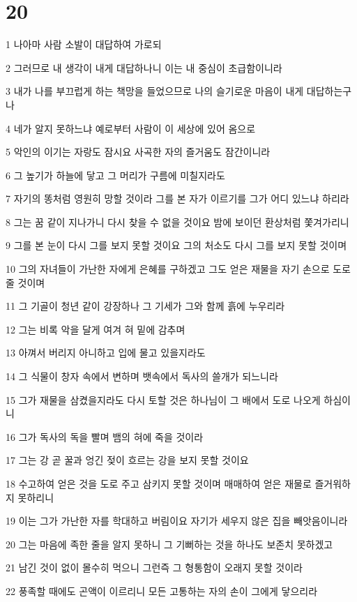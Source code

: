 \chapter{20}

\par 1 나아마 사람 소발이 대답하여 가로되
\par 2 그러므로 내 생각이 내게 대답하나니 이는 내 중심이 초급함이니라
\par 3 내가 나를 부끄럽게 하는 책망을 들었으므로 나의 슬기로운 마음이 내게 대답하는구나
\par 4 네가 알지 못하느냐 예로부터 사람이 이 세상에 있어 옴으로
\par 5 악인의 이기는 자랑도 잠시요 사곡한 자의 즐거움도 잠간이니라
\par 6 그 높기가 하늘에 닿고 그 머리가 구름에 미칠지라도
\par 7 자기의 똥처럼 영원히 망할 것이라 그를 본 자가 이르기를 그가 어디 있느냐 하리라
\par 8 그는 꿈 같이 지나가니 다시 찾을 수 없을 것이요 밤에 보이던 환상처럼 쫓겨가리니
\par 9 그를 본 눈이 다시 그를 보지 못할 것이요 그의 처소도 다시 그를 보지 못할 것이며
\par 10 그의 자녀들이 가난한 자에게 은혜를 구하겠고 그도 얻은 재물을 자기 손으로 도로 줄 것이며
\par 11 그 기골이 청년 같이 강장하나 그 기세가 그와 함께 흙에 누우리라
\par 12 그는 비록 악을 달게 여겨 혀 밑에 감추며
\par 13 아껴서 버리지 아니하고 입에 물고 있을지라도
\par 14 그 식물이 창자 속에서 변하며 뱃속에서 독사의 쓸개가 되느니라
\par 15 그가 재물을 삼켰을지라도 다시 토할 것은 하나님이 그 배에서 도로 나오게 하심이니
\par 16 그가 독사의 독을 빨며 뱀의 혀에 죽을 것이라
\par 17 그는 강 곧 꿀과 엉긴 젖이 흐르는 강을 보지 못할 것이요
\par 18 수고하여 얻은 것을 도로 주고 삼키지 못할 것이며 매매하여 얻은 재물로 즐거워하지 못하리니
\par 19 이는 그가 가난한 자를 학대하고 버림이요 자기가 세우지 않은 집을 빼앗음이니라
\par 20 그는 마음에 족한 줄을 알지 못하니 그 기뻐하는 것을 하나도 보존치 못하겠고
\par 21 남긴 것이 없이 몰수히 먹으니 그런즉 그 형통함이 오래지 못할 것이라
\par 22 풍족할 때에도 곤액이 이르리니 모든 고통하는 자의 손이 그에게 닿으리라
